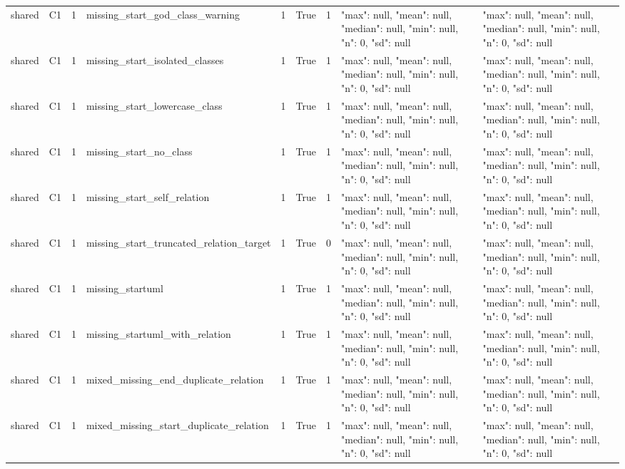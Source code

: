 \begin{tabular}{lllllllll}
shared & C1 & 1 & missing\_start\_god\_class\_warning & 1 & True & 1 & {"max": null, "mean": null, "median": null, "min": null, "n": 0, "sd": null} & {"max": null, "mean": null, "median": null, "min": null, "n": 0, "sd": null} \\
shared & C1 & 1 & missing\_start\_isolated\_classes & 1 & True & 1 & {"max": null, "mean": null, "median": null, "min": null, "n": 0, "sd": null} & {"max": null, "mean": null, "median": null, "min": null, "n": 0, "sd": null} \\
shared & C1 & 1 & missing\_start\_lowercase\_class & 1 & True & 1 & {"max": null, "mean": null, "median": null, "min": null, "n": 0, "sd": null} & {"max": null, "mean": null, "median": null, "min": null, "n": 0, "sd": null} \\
shared & C1 & 1 & missing\_start\_no\_class & 1 & True & 1 & {"max": null, "mean": null, "median": null, "min": null, "n": 0, "sd": null} & {"max": null, "mean": null, "median": null, "min": null, "n": 0, "sd": null} \\
shared & C1 & 1 & missing\_start\_self\_relation & 1 & True & 1 & {"max": null, "mean": null, "median": null, "min": null, "n": 0, "sd": null} & {"max": null, "mean": null, "median": null, "min": null, "n": 0, "sd": null} \\
shared & C1 & 1 & missing\_start\_truncated\_relation\_target & 1 & True & 0 & {"max": null, "mean": null, "median": null, "min": null, "n": 0, "sd": null} & {"max": null, "mean": null, "median": null, "min": null, "n": 0, "sd": null} \\
shared & C1 & 1 & missing\_startuml & 1 & True & 1 & {"max": null, "mean": null, "median": null, "min": null, "n": 0, "sd": null} & {"max": null, "mean": null, "median": null, "min": null, "n": 0, "sd": null} \\
shared & C1 & 1 & missing\_startuml\_with\_relation & 1 & True & 1 & {"max": null, "mean": null, "median": null, "min": null, "n": 0, "sd": null} & {"max": null, "mean": null, "median": null, "min": null, "n": 0, "sd": null} \\
shared & C1 & 1 & mixed\_missing\_end\_duplicate\_relation & 1 & True & 1 & {"max": null, "mean": null, "median": null, "min": null, "n": 0, "sd": null} & {"max": null, "mean": null, "median": null, "min": null, "n": 0, "sd": null} \\
shared & C1 & 1 & mixed\_missing\_start\_duplicate\_relation & 1 & True & 1 & {"max": null, "mean": null, "median": null, "min": null, "n": 0, "sd": null} & {"max": null, "mean": null, "median": null, "min": null, "n": 0, "sd": null} \\

\end{tabular}
